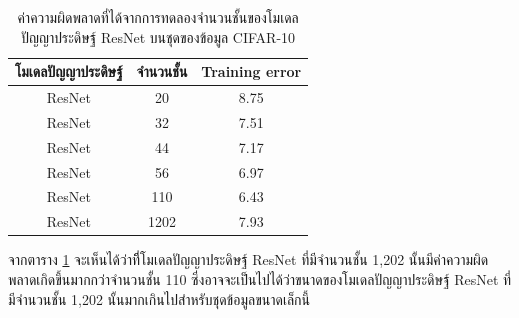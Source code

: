\begin{table}[!ht]
	\centering
	\begin{tabular}{|c|c|c|}
		\hline
		{โมเดลปัญญาประดิษฐ์}		  &{จำนวนชั้น}				    &{Training error}	\\
		\hline
		ResNet						& 20						& 8.75				\\
		ResNet						& 32						& 7.51				\\
		ResNet						& 44						& 7.17				\\
		ResNet						& 56						& 6.97				\\
		ResNet						& 110						& 6.43				\\
		ResNet						& 1202						& 7.93				\\
		\hline
	\end{tabular}
	\caption{ค่าความผิดพลาดที่ได้จากการทดลองจำนวนชั้นของโมเดลปัญญาประดิษฐ์ ResNet บนชุดของข้อมูล CIFAR-10}
	\label{tab: หมวดหมู่ification error}
\end{table}
จากตาราง \ref{tab: หมวดหมู่ification error} จะเห็นได้ว่าที่ีโมเดลปัญญาประดิษฐ์ ResNet ที่มีจำนวนชั้น 1,202 
นั้นมีค่าความผิดพลาดเกิดขึ้นมากกว่าจำนวนชั้น 110 ซึ่งอาจจะเป็นไปได้ว่าขนาดของโมเดลปัญญาประดิษฐ์ ResNet ที่มีจำนวนชั้น 1,202 
นั้นมากเกินไปสำหรับชุดข้อมูลขนาดเล็กนี้